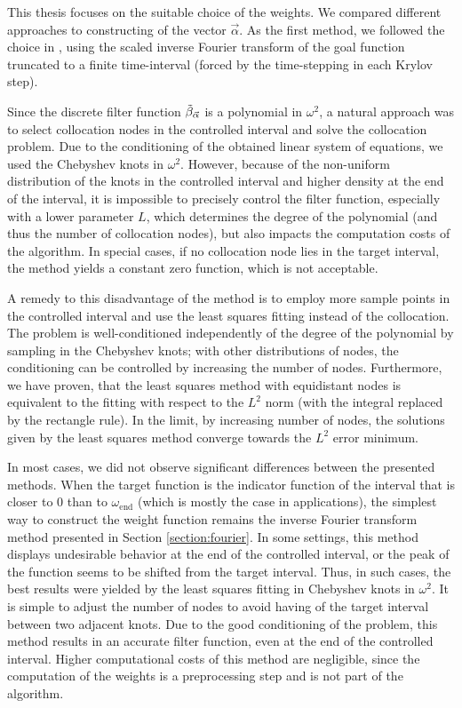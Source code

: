 \documentclass[a4paper,11pt,bibliography=totoc,listof=totoc,headinclude=true,cleardoublepage=empty,oneside]{scrbook}
\newcommand{\dffv}{\Tilde{\beta}_{\Vec{\alpha}}}
\newcommand{\e}{\mathrm{end}}
\begin{document}
This thesis focuses on the suitable choice of the weights. We compared different approaches to constructing of the vector $\Vec{\alpha}$. As the first method, we followed the choice in \cite{nannen}, using the scaled inverse Fourier transform of the goal function truncated to a finite time-interval (forced by the time-stepping in each Krylov step). 

Since the discrete filter function $\dffv$ is a polynomial in $\omega^2$, a natural approach was to select collocation nodes in the controlled interval and solve the collocation problem. Due to the conditioning of the obtained linear system of equations, we used the Chebyshev knots in $\omega^2$. However, because of the non-uniform distribution of the knots in the controlled interval and higher density at the end of the interval, it is impossible to precisely control the filter function, especially with a lower parameter $L$, which determines the degree of the polynomial (and thus the number of collocation nodes), but also impacts the computation costs of the algorithm. In special cases, if no collocation node lies in the target interval, the method yields a constant zero function, which is not acceptable.

A remedy to this disadvantage of the method is to employ more sample points in the controlled interval and use the least squares fitting instead of the collocation. The problem is well-conditioned independently of the degree of the polynomial by sampling in the Chebyshev knots; with other distributions of nodes, the conditioning can be controlled by increasing the number of nodes. Furthermore, we have proven, that the least squares method with equidistant nodes is equivalent to the fitting with respect to the $L^2$ norm (with the integral replaced by the rectangle rule). In the limit, by increasing number of nodes, the solutions given by the least squares method converge towards the $L^2$ error minimum.

In most cases, we did not observe significant differences between the presented methods. When the target function is the indicator function of the interval that is closer to 0 than to $\omega_\e$ (which is mostly the case in applications), the simplest way to construct the weight function remains the inverse Fourier transform method presented in Section \ref{section:fourier}. In some settings, this method displays undesirable behavior at the end of the controlled interval, or the peak of the function seems to be shifted from the target interval. Thus, in such cases, the best results were yielded by the least squares fitting in Chebyshev knots in $\omega^2$. It is simple to adjust the number of nodes to avoid having of the target interval between two adjacent knots. Due to the good conditioning of the problem, this method results in an accurate filter function, even at the end of the controlled interval. Higher computational costs of this method are negligible, since the computation of the weights is a preprocessing step and is not part of the algorithm.
\end{document}
